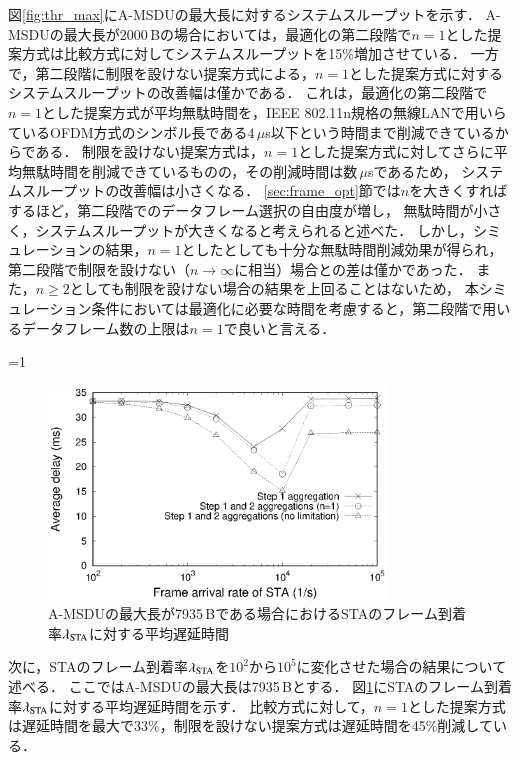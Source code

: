 \documentclass[master]{kuisthesis}		%
\newcounter{flagFig}
\begin{document}
			図\ref{fig:thr_max}にA-MSDUの最大長に対するシステムスループットを示す．
			A-MSDUの最大長が2000\,Bの場合においては，最適化の第二段階で$n=1$とした提案方式は比較方式に対してシステムスループットを15\%増加させている．
			一方で，第二段階に制限を設けない提案方式による，$n=1$とした提案方式に対するシステムスループットの改善幅は僅かである．
			これは，最適化の第二段階で$n=1$とした提案方式が平均無駄時間を，IEEE 802.11n規格の無線LANで用いらているOFDM方式のシンボル長である$4\,\mu$s以下という時間まで削減できているからである．
			制限を設けない提案方式は，$n=1$とした提案方式に対してさらに平均無駄時間を削減できているものの，その削減時間は数$\,\mu$sであるため，
			システムスループットの改善幅は小さくなる．
			\ref{sec:frame_opt}節では$n$を大きくすればするほど，第二段階でのデータフレーム選択の自由度が増し，
			無駄時間が小さく，システムスループットが大きくなると考えられると述べた．
			しかし，シミュレーションの結果，$n=1$としたとしても十分な無駄時間削減効果が得られ，
			第二段階で制限を設けない（$n\to\infty$に相当）場合との差は僅かであった．
			また，$n\geq 2$としても制限を設けない場合の結果を上回ることはないため，
			本シミュレーション条件においては最適化に必要な時間を考慮すると，第二段階で用いるデータフレーム数の上限は$n=1$で良いと言える．
			\par
			\ifnum\value{flagFig}=1 {\begin{figure}[htbp]
				\begin{center}
					\includegraphics[width=0.8\textwidth]{graph/dly_lmd.eps}
					\caption{A-MSDUの最大長が7935\,Bである場合におけるSTAのフレーム到着率$\lambda_{\rm STA}$に対する平均遅延時間}
					\label{fig:dly_lmd}
				\end{center}
			\end{figure}}\fi
			次に，STAのフレーム到着率$\lambda_{\rm STA}$を$10^2$から$10^5$に変化させた場合の結果について述べる．
			ここではA-MSDUの最大長は7935\,Bとする．
			図\ref{fig:dly_lmd}にSTAのフレーム到着率$\lambda_{\rm STA}$に対する平均遅延時間を示す．
			比較方式に対して，$n=1$とした提案方式は遅延時間を最大で33\%，制限を設けない提案方式は遅延時間を45\%削減している．
\end{document}
